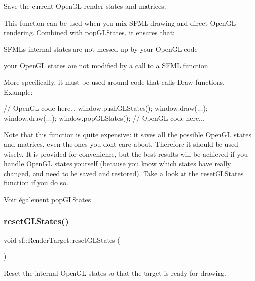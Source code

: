 Save the current Open\+GL render states and matrices. 

This function can be used when you mix S\+F\+ML drawing and direct Open\+GL rendering. Combined with pop\+G\+L\+States, it ensures that\+: \begin{DoxyItemize}
\item S\+F\+ML\textquotesingle{}s internal states are not messed up by your Open\+GL code \item your Open\+GL states are not modified by a call to a S\+F\+ML function\end{DoxyItemize}
More specifically, it must be used around code that calls Draw functions. Example\+: 
\begin{DoxyCode}
\textcolor{comment}{// OpenGL code here...}
window.pushGLStates();
window.draw(...);
window.draw(...);
window.popGLStates();
\textcolor{comment}{// OpenGL code here...}
\end{DoxyCode}


Note that this function is quite expensive\+: it saves all the possible Open\+GL states and matrices, even the ones you don\textquotesingle{}t care about. Therefore it should be used wisely. It is provided for convenience, but the best results will be achieved if you handle Open\+GL states yourself (because you know which states have really changed, and need to be saved and restored). Take a look at the reset\+G\+L\+States function if you do so.

\begin{DoxySeeAlso}{Voir également}
\hyperlink{classsf_1_1RenderTarget_ad5a98401113df931ddcd54c080f7aa8e}{pop\+G\+L\+States} 
\end{DoxySeeAlso}
\mbox{\label{classsf_1_1RenderTarget_aac7504990d27dada4bfe3c7866920765}} 
\subsubsection{\texorpdfstring{reset\+G\+L\+States()}{resetGLStates()}}
{\footnotesize\ttfamily void sf\+::\+Render\+Target\+::reset\+G\+L\+States (\begin{DoxyParamCaption}{ }\end{DoxyParamCaption})}



Reset the internal Open\+GL states so that the target is ready for drawing. 

